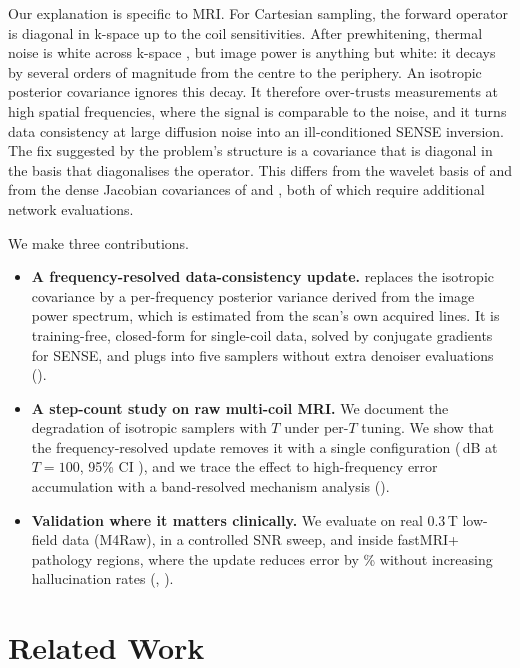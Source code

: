 Our explanation is specific to MRI. For Cartesian sampling, the forward
operator is diagonal in k-space up to the coil sensitivities. After
prewhitening, thermal noise is white across k-space
\citep{roemer1990phased,kellman2005snr}, but image power is anything but white:
it decays by several orders of magnitude from the centre to the periphery. An
isotropic posterior covariance ignores this decay. It therefore over-trusts
measurements at high spatial frequencies, where the signal is comparable to the
noise, and it turns data consistency at large diffusion noise into an
ill-conditioned SENSE inversion. The fix suggested by the problem's structure is
a covariance that is diagonal in the basis that diagonalises the operator. This
differs from the wavelet basis of \citet{peng2024optimal} and from the dense
Jacobian covariances of \citet{boys2024tmpd} and \citet{rozet2024mmps}, both of
which require additional network evaluations.

We make three contributions.
\begin{itemize}
  \item \textbf{A frequency-resolved data-consistency update.} \method{}
  replaces the isotropic covariance by a per-frequency posterior variance
  derived from the image power spectrum, which is estimated from the scan's own
  acquired lines. It is training-free, closed-form for single-coil data,
  solved by conjugate gradients for SENSE, and plugs into five samplers without
  extra denoiser evaluations ().
  \item \textbf{A step-count study on raw multi-coil MRI.} We document the
  degradation of isotropic samplers with $T$ under per-$T$ tuning. We show that
  the frequency-resolved update removes it with a single configuration
  (\pxx\,dB at $T{=}100$, 95\% CI \ci), and we trace the effect to
  high-frequency error accumulation with a band-resolved mechanism analysis
  ().
  \item \textbf{Validation where it matters clinically.} We evaluate on real
  0.3\,T low-field data (M4Raw), in a controlled SNR sweep, and inside fastMRI+
  pathology regions, where the update reduces error by \xx\% without increasing
  hallucination rates (, ).
\end{itemize}

\section{Related Work}
\label{sec:related}


